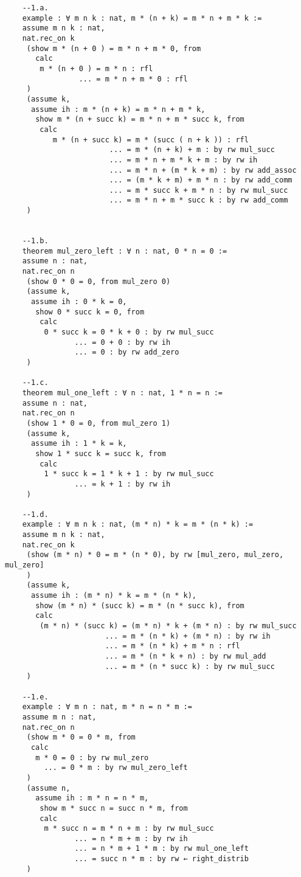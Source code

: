 \begin{center}
\begin{enumerate}
\begin{lstlisting}
    --1.a.
    example : ∀ m n k : nat, m * (n + k) = m * n + m * k := 
    assume m n k : nat,
    nat.rec_on k
     (show m * (n + 0 ) = m * n + m * 0, from
       calc 
        m * (n + 0 ) = m * n : rfl 
                 ... = m * n + m * 0 : rfl
     )
     (assume k,
      assume ih : m * (n + k) = m * n + m * k,
       show m * (n + succ k) = m * n + m * succ k, from
        calc
           m * (n + succ k) = m * (succ ( n + k )) : rfl
                        ... = m * (n + k) + m : by rw mul_succ 
                        ... = m * n + m * k + m : by rw ih
                        ... = m * n + (m * k + m) : by rw add_assoc
                        ... = (m * k + m) + m * n : by rw add_comm
                        ... = m * succ k + m * n : by rw mul_succ
                        ... = m * n + m * succ k : by rw add_comm
     )
    
    
    --1.b.
    theorem mul_zero_left : ∀ n : nat, 0 * n = 0 :=
    assume n : nat,
    nat.rec_on n
     (show 0 * 0 = 0, from mul_zero 0)
     (assume k,
      assume ih : 0 * k = 0,
       show 0 * succ k = 0, from
        calc
         0 * succ k = 0 * k + 0 : by rw mul_succ
                ... = 0 + 0 : by rw ih
                ... = 0 : by rw add_zero
     )
    
    --1.c.
    theorem mul_one_left : ∀ n : nat, 1 * n = n := 
    assume n : nat,
    nat.rec_on n
     (show 1 * 0 = 0, from mul_zero 1)
     (assume k,
      assume ih : 1 * k = k,
       show 1 * succ k = succ k, from
        calc
         1 * succ k = 1 * k + 1 : by rw mul_succ
                ... = k + 1 : by rw ih
     )
    
    --1.d.
    example : ∀ m n k : nat, (m * n) * k = m * (n * k) := 
    assume m n k : nat,
    nat.rec_on k
     (show (m * n) * 0 = m * (n * 0), by rw [mul_zero, mul_zero, mul_zero]
     )
     (assume k,
      assume ih : (m * n) * k = m * (n * k),
       show (m * n) * (succ k) = m * (n * succ k), from
       calc 
        (m * n) * (succ k) = (m * n) * k + (m * n) : by rw mul_succ
                       ... = m * (n * k) + (m * n) : by rw ih
                       ... = m * (n * k) + m * n : rfl
                       ... = m * (n * k + n) : by rw mul_add
                       ... = m * (n * succ k) : by rw mul_succ
     )
    
    --1.e.
    example : ∀ m n : nat, m * n = n * m := 
    assume m n : nat,
    nat.rec_on n 
     (show m * 0 = 0 * m, from
      calc
       m * 0 = 0 : by rw mul_zero
         ... = 0 * m : by rw mul_zero_left
     )
     (assume n,
       assume ih : m * n = n * m,
        show m * succ n = succ n * m, from
        calc
         m * succ n = m * n + m : by rw mul_succ
                ... = n * m + m : by rw ih
                ... = n * m + 1 * m : by rw mul_one_left
                ... = succ n * m : by rw ← right_distrib
     )
    \end{lstlisting}
    

\end{enumerate}
\end{center}
